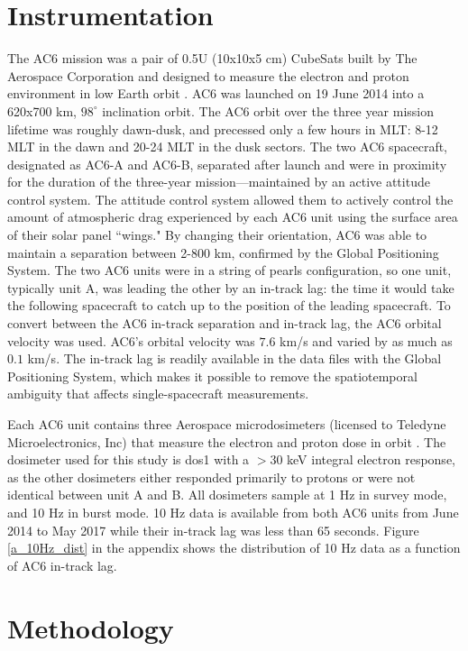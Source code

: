 \documentclass[draft]{agujournal2019}
\begin{document}
\section{Instrumentation} \label{instrumentation}
The AC6 mission was a pair of 0.5U (10x10x5 cm) CubeSats built by The Aerospace Corporation and designed to measure the electron and proton environment in low Earth orbit \cite{O'brien2016}. AC6 was launched on 19 June 2014 into a 620x700 km, $98^\circ$ inclination orbit. The AC6 orbit over the three year mission lifetime was roughly dawn-dusk, and precessed only a few hours in MLT: 8-12 MLT in the dawn and 20-24 MLT in the dusk sectors. The two AC6 spacecraft, designated as AC6-A and AC6-B, separated after launch and were in proximity for the duration of the three-year mission---maintained by an active attitude control system. The attitude control system allowed them to actively control the amount of atmospheric drag experienced by each AC6 unit using the surface area of their solar panel ``wings." By changing their orientation, AC6 was able to maintain a separation between 2-800 km, confirmed by the Global Positioning System. The two AC6 units were in a string of pearls configuration, so one unit, typically unit A, was leading the other by an in-track lag: the time it would take the following spacecraft to catch up to the position of the leading spacecraft. To convert between the AC6 in-track separation and in-track lag, the AC6 orbital velocity was used. AC6's orbital velocity was $7.6$ km/s and varied by as much as $0.1$ km/s. The in-track lag is readily available in the data files with the Global Positioning System, which makes it possible to remove the spatiotemporal ambiguity that affects single-spacecraft measurements.

Each AC6 unit contains three Aerospace microdosimeters (licensed to Teledyne Microelectronics, Inc) that measure the electron and proton dose in orbit \cite{O'brien2016}. The dosimeter used for this study is dos1 with a $> 30$ keV integral electron response, as the other dosimeters either responded primarily to protons or were not identical between unit A and B. All dosimeters sample at 1 Hz in survey mode, and 10 Hz in burst mode. 10 Hz data is available from both AC6 units from June 2014 to May 2017 while their in-track lag was less than 65 seconds. Figure \ref{a_10Hz_dist} in the appendix shows the distribution of 10 Hz data as a function of AC6 in-track lag.

\section{Methodology} 
\end{document}
